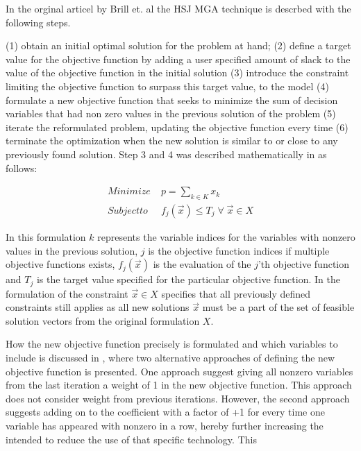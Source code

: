 In the orginal articel by Brill et. al \cite{Brill_MGA_1982} the HSJ MGA technique is descrbed with the following steps. 

(1) obtain an initial optimal solution for the problem at hand; (2) define a target value for the objective function by adding a user specified amount of slack to the value of the objective function in the initial solution (3) introduce the constraint limiting the objective function to surpass this target value, to the model (4) formulate a new objective function that seeks to minimize the sum of decision variables that had non zero values in the previous solution of the problem (5) iterate the reformulated problem, updating the objective function every time (6) terminate the optimization when the new solution is similar to or close to any previously found solution. Step 3 and 4 was described mathematically in \cite{Brill_MGA_1982} as follows:

\begin{equation}
\begin{split}
Minimize \; &  p = \sum_{k \in K} x_k \\
Subject to \; &  f_j(\vec{x}) \leq T_j \; \forall \;  \vec{x}\in X
\end{split}
\end{equation}

In this formulation $k$ represents the variable indices for the variables with nonzero values in the previous solution, $j$ is the objective function indices if multiple objective functions exists, $f_j(\vec{x})$ is the evaluation of the $j$'th objective function and $T_j$ is the target value specified for the particular objective function. In the formulation of the constraint $\vec{x}\in X$ specifies that all previously defined constraints still applies as all new solutions $\vec{x}$ must be a part of the set of feasible solution vectors from the original formulation $X$.

How the new objective function precisely is formulated and which variables to include is discussed in \cite{DECAROLIS2016}, where two alternative approaches of defining the new objective function is presented. One approach suggest giving all nonzero variables from the last iteration a weight of 1 in the new objective function. This approach does not consider weight from previous iterations. However, the second approach suggests adding on to the coefficient with a factor of +1 for every time one variable has appeared with nonzero in a row, hereby further increasing the intended to reduce the use of that specific technology. This 

